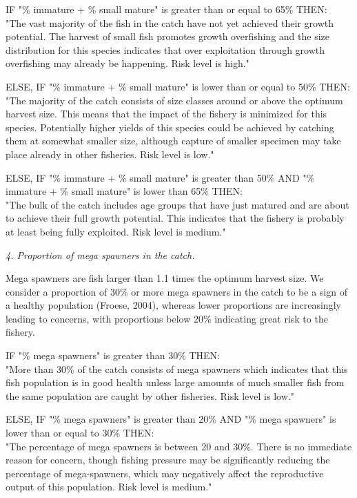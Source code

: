 IF "\% immature + \% small mature" is greater than or equal to 65\% THEN:\\[0cm]
"The vast majority of the fish in the catch have not yet achieved their growth potential. The harvest of small fish promotes growth overfishing and the size distribution for this species indicates that over exploitation through growth overfishing may already be happening. Risk level is high."

ELSE, IF "\% immature + \% small mature" is lower than or equal to 50\% THEN:\\[0cm]
"The majority of the catch consists of size classes around or above the optimum harvest size. This means that the impact of the fishery is minimized for this species. Potentially higher yields of this species could be achieved by catching them at somewhat smaller size, although capture of smaller specimen may take place already in other fisheries. Risk level is low."

ELSE, IF "\% immature + \% small mature" is greater than 50\% AND "\% immature + \% small mature" is lower than 65\% THEN:\\[0cm]
"The bulk of the catch includes age groups that have just matured and are about to achieve their full growth potential. This indicates that the fishery is probably at least being fully exploited. Risk level is medium."

\textit{4. Proportion of mega spawners in the catch.}

Mega spawners are fish larger than 1.1 times the optimum harvest size. We consider a proportion of 30\% or more mega spawners in the catch to be a sign of a healthy population (Froese, 2004), whereas lower proportions are increasingly leading to concerns, with proportions below 20\% indicating great risk to the fishery.

IF "\% mega spawners" is greater than 30\% THEN:\\[0cm]
"More than 30\% of the catch consists of mega spawners which indicates that this fish population is in good health unless large amounts of much smaller fish from the same population are caught by other fisheries. Risk level is low."

\clearpage
\newpage

ELSE, IF "\% mega spawners" is greater than 20\% AND "\% mega spawners" is lower than or equal to 30\% THEN:\\[0cm]
"The percentage of mega spawners is between 20 and 30\%.  There is no immediate reason for concern, though fishing pressure may be significantly reducing the percentage of mega-spawners, which may negatively affect the reproductive output of this population. Risk level is medium."

